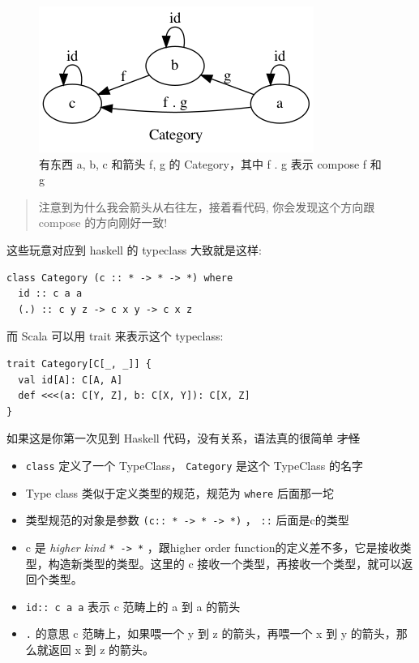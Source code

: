 \documentclass[11pt]{tufte-book}
\begin{document}
\begin{figure}[htbp]
\centering
\includegraphics[width=.9\linewidth]{images/category.png}
\caption{有东西 a, b, c 和箭头 f, g 的 Category，其中 f . g 表示 compose f 和 g}
\end{figure}


\begin{quote}
注意到为什么我会箭头从右往左，接着看代码, 你会发现这个方向跟 compose 的方向刚好一致!
\end{quote}

这些玩意对应到 haskell 的 typeclass 大致就是这样:

\begin{verbatim}
class Category (c :: * -> * -> *) where
  id :: c a a
  (.) :: c y z -> c x y -> c x z
\end{verbatim}


而 Scala 可以用 trait 来表示这个 typeclass:
\begin{verbatim}
trait Category[C[_, _]] {
  val id[A]: C[A, A]
  def <<<(a: C[Y, Z], b: C[X, Y]): C[X, Z] 
}
\end{verbatim}

如果这是你第一次见到 Haskell 代码，没有关系，语法真的很简单 \sout{才怪}
\begin{itemize}
\item \texttt{class} 定义了一个 TypeClass， \texttt{Category} 是这个 TypeClass 的名字
\item Type class 类似于定义类型的规范，规范为 \texttt{where} 后面那一坨
\item 类型规范的对象是参数 \texttt{(c:: * -> * -> *)} ， \texttt{::} 后面是c的类型
\item c 是 \emph{higher kind} \texttt{* -> *} ，跟higher order function的定义差不多，它是接收类型，构造新类型的类型。这里的 c 接收一个类型，再接收一个类型，就可以返回个类型。
\end{itemize}
\begin{itemize}
\item \texttt{id:: c a a} 表示 c 范畴上的 a 到 a 的箭头
\item \texttt{.} 的意思 c 范畴上，如果喂一个 y 到 z 的箭头，再喂一个 x 到 y 的箭头，那么就返回 x 到 z 的箭头。
\end{itemize}
\end{document}

